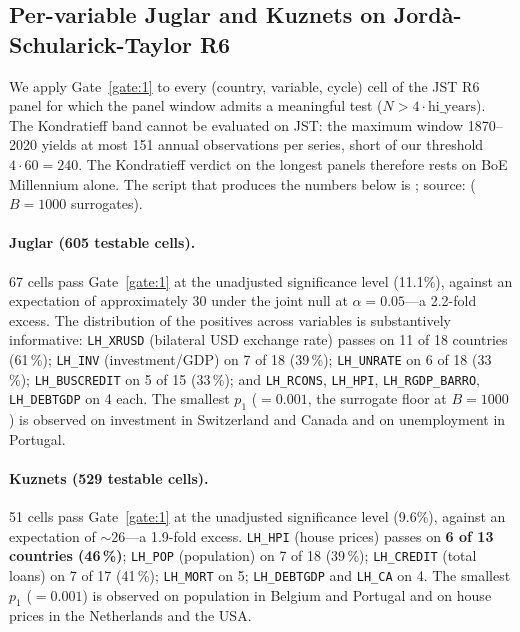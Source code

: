 \subsection{Per-variable Juglar and Kuznets on Jord\`a-Schularick-Taylor R6}

We apply Gate~\ref{gate:1} to every (country, variable, cycle)
cell of the JST R6 panel for which the panel window admits a
meaningful test (\(N > 4 \cdot \text{hi\_years}\)). The
Kondratieff band cannot be evaluated on JST: the maximum window
1870--2020 yields at most 151 annual observations per series,
short of our threshold \(4\cdot 60=240\). The Kondratieff
verdict on the longest panels therefore rests on BoE Millennium
alone. The script that produces the numbers below is
; source:
 (\(B=1000\) surrogates).

\paragraph{Juglar (605 testable cells).}
67 cells pass Gate~\ref{gate:1} at the unadjusted significance
level (11.1\%), against an expectation of approximately 30
under the joint null at \(\alpha=0.05\)---a 2.2-fold excess.
The distribution of the positives across variables is
substantively informative: \texttt{LH\_XRUSD} (bilateral USD
exchange rate) passes on 11 of 18 countries (61\,\%);
\texttt{LH\_INV} (investment/GDP) on 7 of 18 (39\,\%);
\texttt{LH\_UNRATE} on 6 of 18 (33\,\%);
\texttt{LH\_BUSCREDIT} on 5 of 15 (33\,\%); and
\texttt{LH\_RCONS}, \texttt{LH\_HPI},
\texttt{LH\_RGDP\_BARRO}, \texttt{LH\_DEBTGDP} on 4 each.
The smallest \(p_1\) (\(=0.001\), the surrogate floor at
\(B=1000\)) is observed on investment in Switzerland and Canada
and on unemployment in Portugal.

\paragraph{Kuznets (529 testable cells).}
51 cells pass Gate~\ref{gate:1} at the unadjusted significance
level (9.6\%), against an expectation of \(\sim 26\)---a
1.9-fold excess. \texttt{LH\_HPI} (house prices) passes on
\textbf{6 of 13 countries (46\,\%)}; \texttt{LH\_POP}
(population) on 7 of 18 (39\,\%); \texttt{LH\_CREDIT} (total
loans) on 7 of 17 (41\,\%); \texttt{LH\_MORT} on 5;
\texttt{LH\_DEBTGDP} and \texttt{LH\_CA} on 4. The smallest
\(p_1\) (\(=0.001\)) is observed on population in Belgium and
Portugal and on house prices in the Netherlands and the USA.

